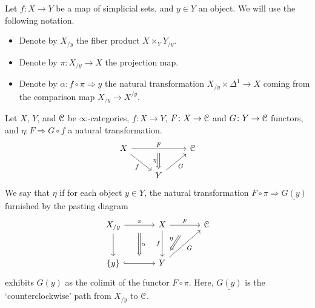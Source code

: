 \documentclass[main.tex]{subfiles}
\begin{document}
\begin{notation}
  \label{notation:rund_um_undercategories}
  Let $f\colon X \to Y$ be a map of simplicial sets, and $y \in Y$ an object. We will use the following notation.
  \begin{itemize}
    \item Denote by $X_{/y}$ the fiber product $X \times_{Y} Y_{/y}$.

    \item Denote by $\pi\colon X_{/y} \to X$ the projection map.

    \item Denote by $\alpha\colon f \circ \pi \Rightarrow \underline{y}$ the natural transformation $X_{/y} \times \Delta^{1} \to X$ coming from the comparison map $X_{/y} \to X^{/y}$.
  \end{itemize}
\end{notation}

\begin{definition}
  \label{def:nat_xfo_exhibiting_left_kan_ext}
  Let $X$, $Y$, and $\mathcal{C}$ be $\infty$-categories, $f\colon X \to Y$, $F\colon X \to \mathcal{C}$ and $G\colon Y \to \mathcal{C}$ functors, and $\eta\colon F \Rightarrow G \circ f$ a natural transformation.
  \begin{equation*}
    \begin{tikzcd}
      X
      \arrow[dr, swap, "f"]
      \arrow[rr, "F", ""{below, name=M}]
      && \category{C}
      \\
      & Y
      \arrow[ur, swap, "G"]
      \arrow[from=M, Rightarrow, swap, "\eta"]
    \end{tikzcd}
  \end{equation*}
  We say that $\eta$  if for each object $y \in Y$, the natural transformation $F \circ \pi \Rightarrow \underline{G(y)}$ furnished by the pasting diagram
  \begin{equation*}
    \begin{tikzcd}[row sep=large, column sep=large]
      X_{/y}
      \arrow[r, "\pi", ""{name=LA, swap}]
      \arrow[d, ""{name=LD}]
      & X
      \arrow[d, swap, "f"]
      \arrow[r, "F", ""{below, name=M}]
      & \category{C}
      \\
      \{y\}
      \arrow[r, hook, ""{name=LB}]
      & Y
      \arrow[ur, swap, "G"]
      \arrow[from=M, Rightarrow, shorten=2ex, swap, "\eta"]
      \arrow[from=LA, to=LB, Rightarrow, shorten=1ex, "\alpha"]
    \end{tikzcd}
  \end{equation*}
  exhibits $G(y)$ as the colimit of the functor $F \circ \pi$. Here, $\underline{G(y)}$ is the `counterclockwise' path from $X_{/y}$ to $\mathcal{C}$.
\end{definition}
\end{document}
